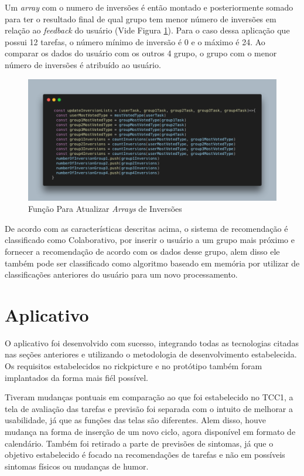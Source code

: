 Um \emph{array} com o numero de inversões é então montado e posteriormente somado para ter o resultado final de qual grupo tem menor número de 
inversões em relação ao \emph{feedback} do usuário (Vide Figura \ref{fig17}). 
Para o caso dessa aplicação que possui 12 tarefas, o número mínimo de inversão é 0 e o máximo é 24. Ao comparar os dados do usuário 
com os outros 4 grupo, o grupo com o menor número de inversões é atribuído ao usuário. 

\begin{figure}[ht]
    \centering
    \includegraphics[keepaspectratio=true,scale=0.35]{figuras/code-updateInversionLists.png}
    \caption{Função Para Atualizar \emph{Arrays} de Inversões}
        \label{fig17}
\end{figure}

De acordo com as características descritas acima, o sistema de recomendação é classificado como Colaborativo, por inserir o usuário a 
um grupo mais próximo e fornecer a recomendação de acordo com os dados desse grupo, alem disso ele também pode ser classificado como 
algoritmo baseado em memória por utilizar de classificações anteriores do usuário para um novo processamento.


\section{Aplicativo}

O aplicativo foi desenvolvido com sucesso, integrando todas as tecnologias citadas nas seções anteriores e 
utilizando o metodologia de desenvolvimento estabelecida. Os requisitos estabelecidos no rickpicture e 
no protótipo também foram implantados da forma mais fiél possível. 

Tiveram mudanças pontuais em comparação ao que foi estabelecido no TCC1, a tela de avaliação das tarefas e 
previsão foi separada com o intuito de melhorar a usabilidade, já que as funções das telas são diferentes.
Alem disso, houve mudança na forma de inserção de um novo ciclo, agora disponível em formato de calendário. 
Também foi retirado a parte de previsões de sintomas, já que o objetivo estabelecido é focado na recomendações de 
tarefas e não em possíveis sintomas físicos ou mudanças de humor.

